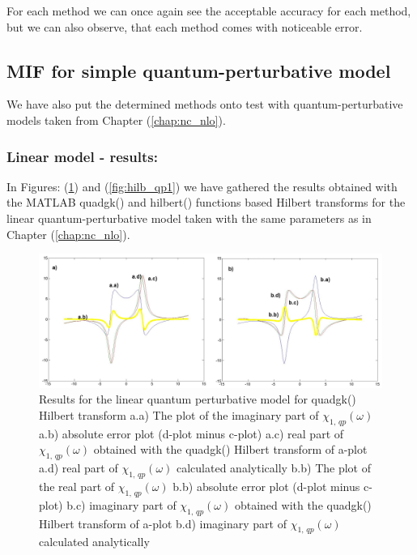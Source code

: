 \documentclass[12pt,twoside,a4paper]{article}
\numberwithin{equation}{subsection}
\numberwithin{figure}{subsection}
\begin{document}
For each method we can once again see the acceptable accuracy for each method, but we can also observe, that each method comes
with noticeable error.

\subsection{MIF for simple quantum-perturbative model} \label{chap:matlab_quantum}

We have also put the determined methods onto test with quantum-perturbative models taken from Chapter (\ref{chap:nc_nlo}).

\subsubsection*{Linear model - results:}

In Figures: (\ref{fig:quadgk_qp1}) and (\ref{fig:hilb_qp1}) we have gathered the results ob\-tained with the MATLAB quadgk() and
hilbert() functions based Hil\-bert tran\-sforms for the linear qua\-ntum\--per\-tur\-ba\-tive model taken with the same para\-meters as in
Chapter (\ref{chap:nc_nlo}).

\begin{figure}
  \includegraphics[width=150mm]{img/quadgk_qp1.png}
  \caption{Results for the linear quantum perturbative model for quadgk() Hilbert transform
    a.a) The plot of the imaginary part of ${\chi_{1, \, qp}}(\omega )$
    a.b) absolute error plot (d-plot minus c-plot) 
    a.c) real part of ${\chi_{1, \, qp}}(\omega )$ obtained with the quadgk() Hilbert transform of a-plot 
    a.d) real part of ${\chi_{1, \, qp}}(\omega )$ calculated analytically 
    b.b) The plot of the real part of ${\chi_{1, \, qp}}(\omega )$ 
    b.b) absolute error plot (d-plot minus c-plot) 
    b.c) imaginary part of ${\chi_{1, \, qp}}(\omega )$ obtained with the quadgk()  Hilbert transform of a-plot 
    b.d) imaginary part of ${\chi_{1, \, qp}}(\omega )$ calculated analytically  
    \label{fig:quadgk_qp1}
  }
\end{figure}
\end{document}
